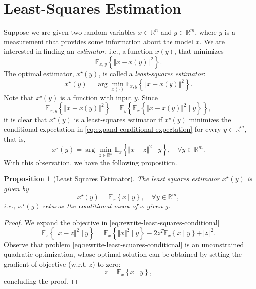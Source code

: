 \documentclass[
]{book}
\newtheorem{proposition}{Proposition}[chapter]
\theoremstyle{definition}
\theoremstyle{definition}
\theoremstyle{definition}
\theoremstyle{definition}
\theoremstyle{remark}
\begin{document}
\hypertarget{least-squares-estimation}{%
\section{Least-Squares Estimation}\label{least-squares-estimation}}

Suppose we are given two random variables \(x \in \mathbb{R}^n\) and \(y \in \mathbb{R}^m\), where \(y\) is a measurement that provides some information about the model \(x\). We are interested in finding an \emph{estimator}, i.e., a function \(x(y)\), that minimizes
\[
\mathbb{E}_{x,y} \left\{ \Vert x - x(y) \Vert^2 \right\}.
\]
The optimal estimator, \(x^\star(y)\), is called a \emph{least-squares estimator}:
\[
x^\star(y) = \arg\min_{x(\cdot)} \mathbb{E}_{x,y} \left\{ \Vert x - x(y) \Vert^2 \right\}.
\]
Note that \(x^\star(y)\) is a function with input \(y\).
Since
\begin{equation}
\mathbb{E}_{x,y}\left\{ \Vert x - x(y) \Vert^2 \right\} = \mathbb{E}_y \left\{ \mathbb{E}_x \left\{ \Vert x - x(y) \Vert^2 \mid y\right\} \right\},
\label{eq:expand-conditional-expectation}
\end{equation}
it is clear that \(x^\star(y)\) is a least-squares estimator if \(x^\star(y)\) minimizes the conditional expectation in \eqref{eq:expand-conditional-expectation} for every \(y \in \mathbb{R}^m\), that is,
\begin{equation}
x^\star(y) = \arg\min_{z \in \mathbb{R}^n} \mathbb{E}_x \left\{ \Vert x - z \Vert^2 \mid y \right\}, \quad \forall y \in \mathbb{R}^m.
\label{eq:rewrite-least-squares-conditional}
\end{equation}
With this observation, we have the following proposition.

\begin{proposition}[Least Squares Estimator]
\protect\hypertarget{prp:least-squares-estimator}{}\label{prp:least-squares-estimator}The least squares estimator \(x^\star(y)\) is given by
\begin{equation}
x^\star(y) = \mathbb{E}_x \left\{ x \mid y \right\}, \quad \forall y \in \mathbb{R}^m,
\label{eq:conditional-mean}
\end{equation}
i.e., \(x^\star(y)\) returns the conditional mean of \(x\) given \(y\).
\end{proposition}

\begin{proof}
We expand the objective in \eqref{eq:rewrite-least-squares-conditional}
\[
\mathbb{E}_x \left\{ \Vert x - z \Vert^2 \mid y \right\} = \mathbb{E}_x \left\{ \Vert x \Vert^2 \mid y \right\} - 2 z^T \mathbb{E}_x \left\{x \mid y \right\} + \Vert z \Vert^2.
\]
Observe that problem \eqref{eq:rewrite-least-squares-conditional} is an unconstrained quadratic optimization, whose optimal solution can be obtained by setting the gradient of objective (w.r.t. \(z\)) to zero:
\[
z = \mathbb{E}_x \left\{ x \mid y \right\},
\]
concluding the proof.
\end{proof}
\end{document}
